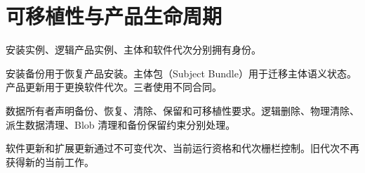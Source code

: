 \chapter{可移植性与产品生命周期}

安装实例、逻辑产品实例、主体和软件代次分别拥有身份。

安装备份用于恢复产品安装。主体包（Subject Bundle）用于迁移主体语义状态。产品更新用于更换软件代次。三者使用不同合同。

数据所有者声明备份、恢复、清除、保留和可移植性要求。逻辑删除、物理清除、派生数据清理、Blob 清理和备份保留约束分别处理。

软件更新和扩展更新通过不可变代次、当前运行资格和代次栅栏控制。旧代次不再获得新的当前工作。
